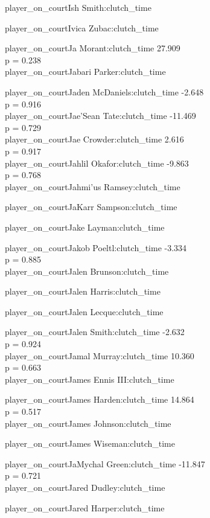 \documentclass[
  landscape]{article}
\begin{document}
player\_on\_courtIsh Smith:clutch\_time

player\_on\_courtIvica Zubac:clutch\_time

player\_on\_courtJa Morant:clutch\_time 27.909\\
p = 0.238\\
player\_on\_courtJabari Parker:clutch\_time

player\_on\_courtJaden McDaniels:clutch\_time -2.648\\
p = 0.916\\
player\_on\_courtJae'Sean Tate:clutch\_time -11.469\\
p = 0.729\\
player\_on\_courtJae Crowder:clutch\_time 2.616\\
p = 0.917\\
player\_on\_courtJahlil Okafor:clutch\_time -9.863\\
p = 0.768\\
player\_on\_courtJahmi'us Ramsey:clutch\_time

player\_on\_courtJaKarr Sampson:clutch\_time

player\_on\_courtJake Layman:clutch\_time

player\_on\_courtJakob Poeltl:clutch\_time -3.334\\
p = 0.885\\
player\_on\_courtJalen Brunson:clutch\_time

player\_on\_courtJalen Harris:clutch\_time

player\_on\_courtJalen Lecque:clutch\_time

player\_on\_courtJalen Smith:clutch\_time -2.632\\
p = 0.924\\
player\_on\_courtJamal Murray:clutch\_time 10.360\\
p = 0.663\\
player\_on\_courtJames Ennis III:clutch\_time

player\_on\_courtJames Harden:clutch\_time 14.864\\
p = 0.517\\
player\_on\_courtJames Johnson:clutch\_time

player\_on\_courtJames Wiseman:clutch\_time

player\_on\_courtJaMychal Green:clutch\_time -11.847\\
p = 0.721\\
player\_on\_courtJared Dudley:clutch\_time

player\_on\_courtJared Harper:clutch\_time
\end{document}
